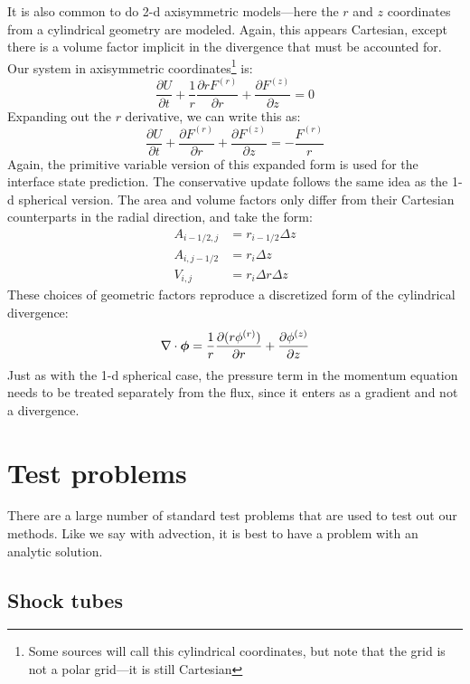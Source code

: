 It is also common to do 2-d axisymmetric models---here the $r$ and $z$
coordinates from a cylindrical geometry are modeled.  Again, this
appears Cartesian, except there is a volume factor implicit in the
divergence that must be accounted for.  Our system in axisymmetric
coordinates\footnote{Some sources will call this cylindrical
  coordinates, but note that the grid is not a polar grid---it is
  still Cartesian} is:
\begin{equation}
\frac{\partial U}{\partial t}
  + \frac{1}{r}\frac{\partial r F^{(r)}}{\partial r}
  + \frac{\partial F^{(z)}}{\partial z} = 0
\end{equation}
Expanding out the $r$ derivative, we can write this as:
\begin{equation}
\frac{\partial U}{\partial t}
  + \frac{\partial F^{(r)}}{\partial r}
  + \frac{\partial F^{(z)}}{\partial z} = -\frac{F^{(r)}}{r}
\end{equation}
Again, the primitive variable version of this expanded form is used
for the interface state prediction.  The conservative update
follows the same idea as the 1-d spherical version.  The area
and volume factors only differ from their Cartesian counterparts
in the radial direction, and take the form:
\begin{align}
A_{i-1/2,j} &= r_{i-1/2} \Delta z \\
A_{i,j-1/2} &= r_i \Delta z\\
V_{i,j} &= r_i \Delta r \Delta z
\end{align}
These choices of geometric factors reproduce a discretized
form of the cylindrical divergence:
\begin{equation}
\nabla \cdot {\boldsymbol{\phi}} = \frac{1}{r} {\frac{{\partial(r\phi^{(r)})}}{\partial r}} + {\frac{{\partial\phi^{(z)}}}{\partial z}}
\end{equation}
Just as with the 1-d spherical case, the pressure term in the momentum
equation needs to be treated separately from the flux, since it enters
as a gradient and not a divergence.


\section{Test problems}

There are a large number of standard test problems that are used to
test out our methods.  Like we say with advection, it is best to have
a problem with an analytic solution.  

\subsection{Shock tubes}

